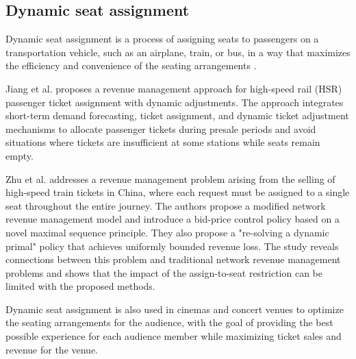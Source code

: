 

\subsection{Dynamic seat assignment}
Dynamic seat assignment is a process of assigning seats to passengers on a transportation vehicle, such as an airplane, train, or bus, in a way that maximizes the efficiency and convenience of the seating arrangements \cite{hamdouch2011schedule, berge1993demand}. 

Jiang et al. \cite{jiang2015dynamic} proposes a revenue management approach for high-speed rail (HSR) passenger ticket assignment with dynamic adjustments. The approach integrates short-term demand forecasting, ticket assignment, and dynamic ticket adjustment mechanisms to allocate passenger tickets during presale periods and avoid situations where tickets are insufficient at some stations while seats remain empty.


Zhu et al. \cite{zhu2023assign} addresses a revenue management problem arising from the selling of high-speed train tickets in China, where each request must be assigned to a single seat throughout the entire journey. The authors propose a modified network revenue management model and introduce a bid-price control policy based on a novel maximal sequence principle. They also propose a "re-solving a dynamic primal" policy that achieves uniformly bounded revenue loss. The study reveals connections between this problem and traditional network revenue management problems and shows that the impact of the assign-to-seat restriction can be limited with the proposed methods.

Dynamic seat assignment is also used in cinemas and concert venues to optimize the seating arrangements for the audience, with the goal of providing the best possible experience for each audience member while maximizing ticket sales and revenue for the venue.

